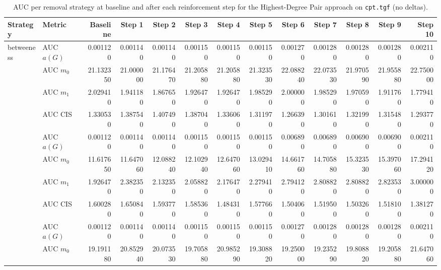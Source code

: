 \begin{table}[htbp]
  \centering
  \caption{AUC per removal strategy at baseline and after each reinforcement step for the Highest-Degree Pair approach on \texttt{cpt.tgf} (no deltas).}
  \label{tab:cpt-highest_degree_pair-auc}
\setlength{\tabcolsep}{2.5pt}
  \begin{tabular}{llrrrrrrrrrrr}
    \toprule
    \textbf{Strategy} & \textbf{Metric} & \textbf{Baseline} & \textbf{Step 1} & \textbf{Step 2} & \textbf{Step 3} & \textbf{Step 4} & \textbf{Step 5} & \textbf{Step 6} & \textbf{Step 7} & \textbf{Step 8} & \textbf{Step 9} & \textbf{Step 10} \\
    \midrule
    \multirow{4}{*}{betweeness} & AUC $a(G)$ & 0.001120 & 0.001140 & 0.001140 & 0.001150 & 0.001150 & 0.001150 & 0.001270 & 0.001280 & 0.001280 & 0.001280 & 0.002110 \\
    & AUC $m_0$ & 21.132350 & 21.000000 & 21.176470 & 21.205880 & 21.205880 & 21.323530 & 22.088240 & 22.073530 & 21.970590 & 21.955880 & 22.750000 \\
    & AUC $m_1$ & 2.029410 & 1.941180 & 1.867650 & 1.926470 & 1.926470 & 1.985290 & 2.000000 & 1.985290 & 1.970590 & 1.911760 & 1.779410 \\
    & AUC CIS & 1.330530 & 1.387540 & 1.407490 & 1.387040 & 1.336060 & 1.311970 & 1.266390 & 1.301610 & 1.321990 & 1.315480 & 1.293770 \\
    \addlinespace
    \multirow{4}{*}{closeness} & AUC $a(G)$ & 0.001120 & 0.001140 & 0.001140 & 0.001150 & 0.001150 & 0.001150 & 0.006890 & 0.006890 & 0.006900 & 0.006900 & 0.002110 \\
    & AUC $m_0$ & 11.617650 & 11.647060 & 12.088240 & 12.102940 & 12.647060 & 13.029410 & 14.661760 & 14.705880 & 15.323530 & 15.397060 & 17.294120 \\
    & AUC $m_1$ & 1.926470 & 2.382350 & 2.132350 & 2.058820 & 2.176470 & 2.279410 & 2.794120 & 2.808820 & 2.808820 & 2.823530 & 3.000000 \\
    & AUC CIS & 1.600280 & 1.650840 & 1.593770 & 1.585360 & 1.484310 & 1.577660 & 1.504060 & 1.519500 & 1.503260 & 1.518100 & 1.381270 \\
    \addlinespace
    \multirow{4}{*}{core influence} & AUC $a(G)$ & 0.001120 & 0.001140 & 0.001140 & 0.001150 & 0.001150 & 0.001150 & 0.001270 & 0.001280 & 0.001280 & 0.001280 & 0.002110 \\
    & AUC $m_0$ & 19.191180 & 20.852940 & 20.073530 & 19.705880 & 20.985290 & 19.308820 & 19.250000 & 19.235290 & 19.808820 & 19.205880 & 21.647060 \\

\end{tabular}
\end{table}
